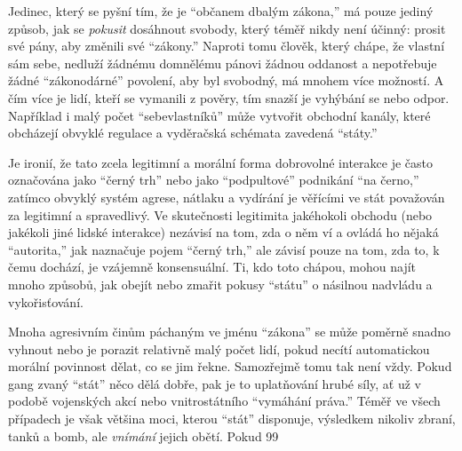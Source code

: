\documentclass{book}
\begin{document}
Jedinec, který se pyšní tím, že je \enquote{občanem dbalým zákona,} má pouze jediný způsob, jak se \emph{pokusit} dosáhnout svobody, který téměř nikdy není účinný: prosit své pány, aby změnili své \enquote{zákony.} Naproti tomu člověk, který chápe, že vlastní sám sebe, nedluží žádnému domnělému pánovi žádnou oddanost a nepotřebuje žádné \enquote{zákonodárné} povolení, aby byl svobodný, má mnohem více možností. A čím více je lidí, kteří se vymanili z pověry, tím snazší je vyhýbání se nebo odpor. Například i malý počet \enquote{sebevlastníků} může vytvořit obchodní kanály, které obcházejí obvyklé regulace a vyděračská schémata zavedená \enquote{státy.}

Je ironií, že tato zcela legitimní a morální forma dobrovolné interakce je často označována jako \enquote{černý trh} nebo jako \enquote{podpultové} podnikání \enquote{na černo,} zatímco obvyklý systém agrese, nátlaku a vydírání je věřícími ve stát považován za legitimní a spravedlivý. Ve skutečnosti legitimita jakéhokoli obchodu (nebo jakékoli jiné lidské interakce) nezávisí na tom, zda o něm ví a ovládá ho nějaká \enquote{autorita,} jak naznačuje pojem \enquote{černý trh,} ale závisí pouze na tom, zda to, k čemu dochází, je vzájemně konsensuální. Ti, kdo toto chápou, mohou najít mnoho způsobů, jak obejít nebo zmařit pokusy \enquote{státu} o násilnou nadvládu a vykořisťování.

Mnoha agresivním činům páchaným ve jménu \enquote{zákona} se může poměrně snadno vyhnout nebo je porazit relativně malý počet lidí, pokud necítí automatickou morální povinnost dělat, co se jim řekne. Samozřejmě tomu tak není vždy. Pokud gang zvaný \enquote{stát} něco dělá dobře, pak je to uplatňování hrubé síly, ať už v podobě vojenských akcí nebo vnitrostátního \enquote{vymáhání práva.} Téměř ve všech případech je však většina moci, kterou \enquote{stát} disponuje, výsledkem nikoliv zbraní, tanků a bomb, ale \emph{vnímání} jejich obětí. Pokud 99 %
\end{document}
